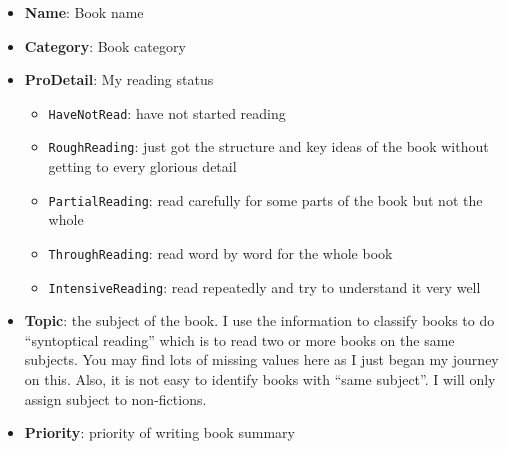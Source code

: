 \documentclass[12pt,]{krantz}
\newenvironment{Shaded}{\begin{snugshade}}{\end{snugshade}}
\newcommand{\KeywordTok}[1]{\textcolor[rgb]{0.13,0.29,0.53}{\textbf{#1}}}
\newcommand{\DataTypeTok}[1]{\textcolor[rgb]{0.13,0.29,0.53}{#1}}
\newcommand{\StringTok}[1]{\textcolor[rgb]{0.31,0.60,0.02}{#1}}
\newcommand{\OperatorTok}[1]{\textcolor[rgb]{0.81,0.36,0.00}{\textbf{#1}}}
\newcommand{\NormalTok}[1]{#1}
\providecommand{\tightlist}{%
  \setlength{\itemsep}{0pt}\setlength{\parskip}{0pt}}
\begin{document}
\begin{Shaded}
\end{Shaded}

\hypertarget{htmlwidget-881baf269275c3bfd8b7}{}

\begin{itemize}
\tightlist
\item
  \textbf{Name}: Book name
\item
  \textbf{Category}: Book category
\item
  \textbf{ProDetail}: My reading status

  \begin{itemize}
  \tightlist
  \item
    \texttt{HaveNotRead}: have not started reading
  \item
    \texttt{RoughReading}: just got the structure and key ideas of the
    book without getting to every glorious detail
  \item
    \texttt{PartialReading}: read carefully for some parts of the book
    but not the whole
  \item
    \texttt{ThroughReading}: read word by word for the whole book
  \item
    \texttt{IntensiveReading}: read repeatedly and try to understand it
    very well
  \end{itemize}
\item
  \textbf{Topic}: the subject of the book. I use the information to
  classify books to do ``syntoptical reading'' which is to read two or
  more books on the same subjects. You may find lots of missing values
  here as I just began my journey on this. Also, it is not easy to
  identify books with ``same subject''. I will only assign subject to
  non-fictions.
\item
  \textbf{Priority}: priority of writing book summary
\end{itemize}

\mainmatter
\end{document}

